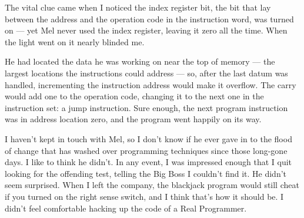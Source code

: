 \documentclass[12pt]{article}
\begin{document}
\bigskip
\noindent
The vital clue came when I noticed the index register bit,
the bit that lay between the address and the operation code
in the instruction word, was turned on --- yet Mel never used
the index register, leaving it zero all the time. When the
light went on it nearly blinded me.

\bigskip
\noindent
He had located the data he was working on near the top of
memory --- the largest locations the instructions could
address --- so, after the last datum was handled,
incrementing the instruction address would make it overflow.
The carry would add one to the operation code, changing it
to the next one in the instruction set: a jump instruction.
Sure enough, the next program instruction was in address
location zero, and the program went happily on its way.

\bigskip
\noindent
I haven't kept in touch with Mel, so I don't know if he ever
gave in to the flood of change that has washed over
programming techniques since those long-gone days. I like
to think he didn't. In any event, I was impressed enough
that I quit looking for the offending test, telling the Big
Boss I couldn't find it. He didn't seem surprised. When I
left the company, the blackjack program would still cheat if
you turned on the right sense switch, and I think that's how
it should be. I didn't feel comfortable hacking up the code
of a Real Programmer.
\end{document}
